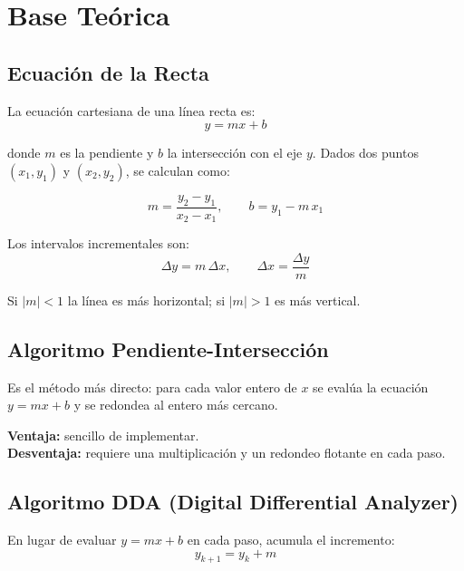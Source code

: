 \documentclass[12pt,a4paper]{article}
\begin{document}
\section{Base Teórica}

\subsection{Ecuación de la Recta}

La ecuación cartesiana de una línea recta es:
\begin{equation}
  y = mx + b
\end{equation}

donde $m$ es la pendiente y $b$ la intersección con el eje $y$. Dados dos puntos
$(x_1, y_1)$ y $(x_2, y_2)$, se calculan como:

\begin{equation}
  m = \frac{y_2 - y_1}{x_2 - x_1}, \qquad b = y_1 - m\,x_1
\end{equation}

Los intervalos incrementales son:
\begin{equation}
  \Delta y = m\,\Delta x, \qquad \Delta x = \frac{\Delta y}{m}
\end{equation}

Si $|m| < 1$ la línea es más horizontal; si $|m| > 1$ es más vertical.

\subsection{Algoritmo Pendiente-Intersección}

Es el método más directo: para cada valor entero de $x$ se evalúa la ecuación
$y = mx + b$ y se redondea al entero más cercano.

\textbf{Ventaja:} sencillo de implementar.\\
\textbf{Desventaja:} requiere una multiplicación y un redondeo flotante en cada paso.

\subsection{Algoritmo DDA (Digital Differential Analyzer)}

En lugar de evaluar $y = mx + b$ en cada paso, acumula el incremento:
\begin{equation}
  y_{k+1} = y_k + m
\end{equation}
\end{document}
